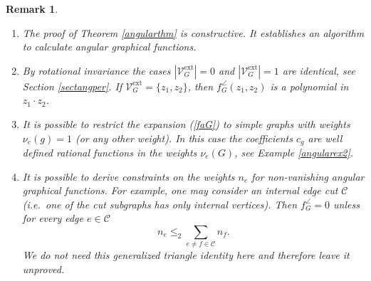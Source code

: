 \documentclass[oneside]{amsart}
\newcommand{\sC}{\mathcal{C}}
\newcommand{\sV}{\mathcal{V}}
\newcommand{\sVGext}{{\sV_G^\mathrm{ext}}}
\newcommand{\VGext}{{|\sVGext|}}
\theoremstyle{plain}
\newtheorem{remark}[thm]{Remark}
\begin{document}
\begin{remark}\mbox{}
\begin{enumerate}
\item The proof of Theorem \ref{angularthm} is constructive. It establishes an algorithm to calculate angular graphical functions.
\item By rotational invariance the cases $\VGext=0$ and $\VGext=1$ are identical, see Section \ref{sectangper}.
If $\sVGext=\{z_1,z_2\}$, then $f_G^\angle(z_1,z_2)$ is a polynomial in $z_1\cdot z_2$.
\item It is possible to restrict the expansion (\ref{faG}) to simple graphs with weights $\nu_e(g)=1$ (or any other weight). In this case the coefficients $c_g$ are
well defined rational functions in the weights $\nu_e(G)$, see Example \ref{angularex2}.
\item It is possible to derive constraints on the weights $n_e$ for non-vanishing angular graphical functions.
For example, one may consider an internal edge cut $\sC$ (i.e.\ one of the cut subgraphs has only internal vertices).
Then $f_G^\angle=0$ unless for every edge $e\in\sC$
$$
n_e\leq_2\sum_{e\neq f\in\sC}n_f.
$$
We do not need this generalized triangle identity here and therefore leave it unproved.
\end{enumerate}
\end{remark}

\end{document}
